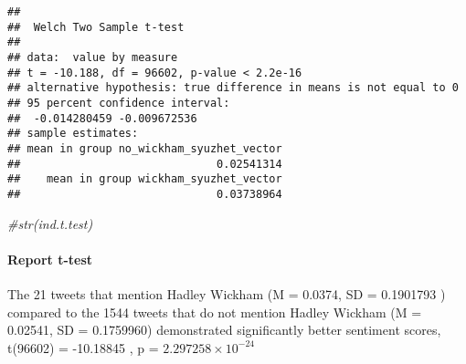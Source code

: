 \documentclass[]{article}
\newenvironment{Shaded}{\begin{snugshade}}{\end{snugshade}}
\newcommand{\CommentTok}[1]{\textcolor[rgb]{0.56,0.35,0.01}{\textit{#1}}}
\newcommand{\NormalTok}[1]{#1}
\newcommand{\OperatorTok}[1]{\textcolor[rgb]{0.81,0.36,0.00}{\textbf{#1}}}
\newcommand{\StringTok}[1]{\textcolor[rgb]{0.31,0.60,0.02}{#1}}
\let\oldparagraph\paragraph
\renewcommand{\paragraph}[1]{\oldparagraph{#1}\mbox{}}
\begin{document}
\begin{verbatim}
## 
##  Welch Two Sample t-test
## 
## data:  value by measure
## t = -10.188, df = 96602, p-value < 2.2e-16
## alternative hypothesis: true difference in means is not equal to 0
## 95 percent confidence interval:
##  -0.014280459 -0.009672536
## sample estimates:
## mean in group no_wickham_syuzhet_vector 
##                              0.02541314 
##    mean in group wickham_syuzhet_vector 
##                              0.03738964
\end{verbatim}

\begin{Shaded}
\begin{Highlighting}[]
\CommentTok{#str(ind.t.test)}
\end{Highlighting}
\end{Shaded}

\hypertarget{report-t-test}{%
\paragraph{Report t-test}\label{report-t-test}}

\begin{Shaded}
\end{Shaded}

The 21 tweets that mention Hadley Wickham (M = 0.0374, SD = 0.1901793 )
compared to the 1544 tweets that do not mention Hadley Wickham (M =
0.02541, SD = 0.1759960) demonstrated significantly better sentiment
scores, t(96602) = -10.18845 , p = \ensuremath{2.297258\times 10^{-24}}
\end{document}
